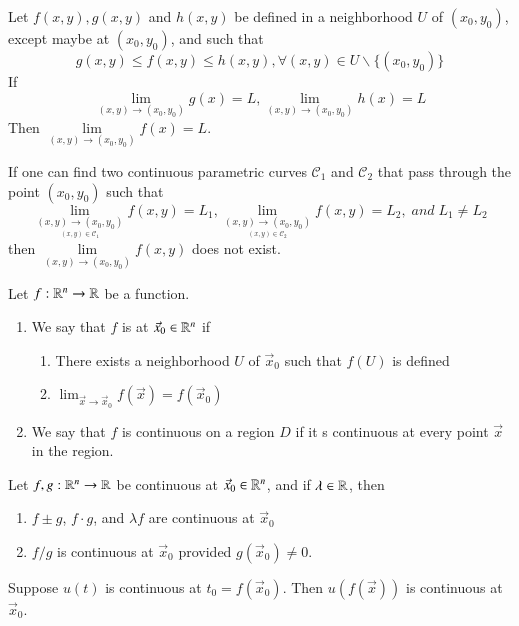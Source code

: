 \documentclass[12pt, a4paper, oneside, openright, titlepage]{book}
\begin{document}
\begin{appendices}
    \begin{thm}
        Let $f(x,y), g(x,y)$ and $h(x,y)$ be defined in a neighborhood $U$ of $(x_0,y_0)$, except maybe at $(x_0,y_0)$, and such that \begin{equation}
            g(x,y) \leq f(x,y) \leq h(x,y), \forall (x,y) \in U\backslash\{(x_0,y_0)\}
        \end{equation}
        If \begin{equation}
            \lim\limits_{(x,y)\rightarrow (x_0,y_0)}g(x) = L,\lim\limits_{(x,y)\rightarrow (x_0,y_0)}h(x) = L
        \end{equation}
        Then $\lim\limits_{(x,y)\rightarrow (x_0,y_0)} f(x) = L$.
    \end{thm}

    \begin{thm}
        If one can find two continuous parametric curves $\mathscr{C}_1$ and $\mathscr{C}_2$ that pass through the point $(x_0,y_0)$ such that \begin{equation}
            \lim\limits_{\underset{(x,y) \in \mathscr{C}_1}{(x,y)\rightarrow (x_0,y_0)}}f(x,y) = L_1, \lim\limits_{\underset{(x,y) \in \mathscr{C}_2}{(x,y)\rightarrow (x_0,y_0)}}f(x,y) = L_2,\;and\;L_1 \neq L_2
        \end{equation}
        then $\lim\limits_{(x,y)\rightarrow (x_0,y_0)}f(x,y)$ does not exist.
    \end{thm}

   
    \begin{defn}
        Let $f:\mathbb R^n\rightarrow \mathbb R$ be a function. \begin{enumerate}
            \item We say that $f$ is  at $\vec{x}_0 \in \mathbb R^n$ if \begin{enumerate}
                    \item There exists a neighborhood $U$ of $\vec{x}_0$ such that $f(U)$ is defined
                    \item $\lim_{\vec{x}\rightarrow \vec{x}_0}f(\vec{x}) = f(\vec{x}_0)$
            \end{enumerate}
            \item We say that $f$ is continuous on a region $D$ if it s continuous at every point $\vec{x}$ in the region.
        \end{enumerate}
    \end{defn}


    \begin{rmk}
        Let $f,g:\mathbb R^n\rightarrow \mathbb R$ be continuous at $\vec{x}_0 \in \mathbb R^n$, and if $\lambda \in \mathbb R$, then \begin{enumerate}
            \item $f\pm g$, $f\cdot g$, and $\lambda f$ are continuous at $\vec{x}_0$
            \item $f/g$ is continuous at $\vec{x}_0$ provided $g(\vec{x}_0) \neq 0$.
        \end{enumerate}
        Suppose $u(t)$ is continuous at $t_0 = f(\vec{x}_0)$. Then $u(f(\vec{x}))$ is continuous at $\vec{x}_0$.
    \end{rmk}


\end{appendices}
\end{document}
